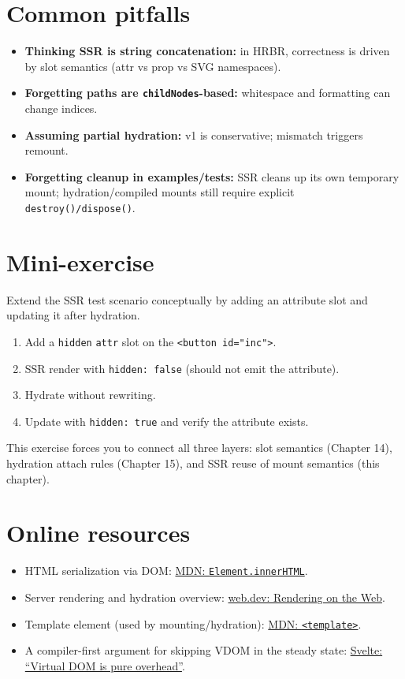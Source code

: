 \section{Common pitfalls}

\begin{itemize}
  \item \textbf{Thinking SSR is string concatenation:} in HRBR, correctness is driven by slot semantics (attr vs prop vs SVG namespaces).
  \item \textbf{Forgetting paths are \texttt{childNodes}-based:} whitespace and formatting can change indices.
  \item \textbf{Assuming partial hydration:} v1 is conservative; mismatch triggers remount.
  \item \textbf{Forgetting cleanup in examples/tests:} SSR cleans up its own temporary mount; hydration/compiled mounts still require explicit \texttt{destroy()/dispose()}.
\end{itemize}

\section{Mini-exercise}

Extend the SSR test scenario conceptually by adding an attribute slot and updating it after hydration.

\begin{enumerate}
  \item Add a \texttt{hidden} \texttt{attr} slot on the \texttt{<button id="inc">}.
  \item SSR render with \texttt{hidden: false} (should not emit the attribute).
  \item Hydrate without rewriting.
  \item Update with \texttt{hidden: true} and verify the attribute exists.
\end{enumerate}

This exercise forces you to connect all three layers:
slot semantics (Chapter 14), hydration attach rules (Chapter 15), and SSR reuse of mount semantics (this chapter).

\section{Online resources}

\begin{itemize}
  \item HTML serialization via DOM:
  \href{https://developer.mozilla.org/en-US/docs/Web/API/Element/innerHTML}{MDN: \texttt{Element.innerHTML}}.
  \item Server rendering and hydration overview:
  \href{https://web.dev/rendering-on-the-web/}{web.dev: Rendering on the Web}.
  \item Template element (used by mounting/hydration):
  \href{https://developer.mozilla.org/en-US/docs/Web/HTML/Element/template}{MDN: \texttt{<template>}}.
  \item A compiler-first argument for skipping VDOM in the steady state:
  \href{https://svelte.dev/blog/virtual-dom-is-pure-overhead}{Svelte: “Virtual DOM is pure overhead”}.
\end{itemize}
